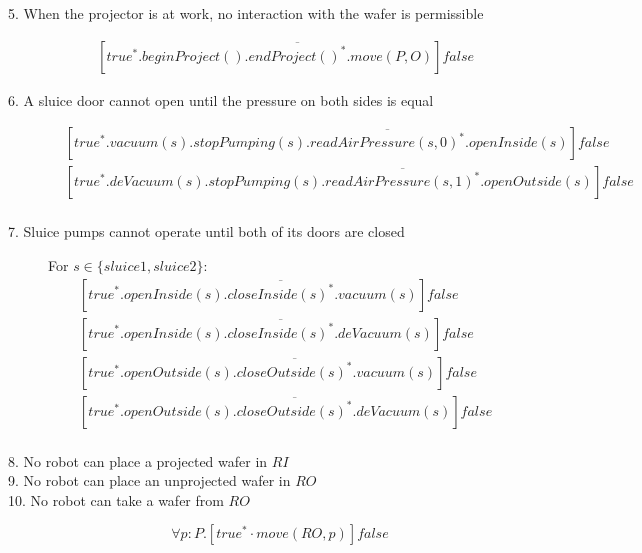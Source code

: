 \begin{description}
 
 \item[5. When the projector is at work, no interaction with the wafer is permissible]
 	\begin{align*}
 		&[true^*.beginProject().\overline{endProject()^*}.move(P,O)]false
	\end{align*}
	
 \item[6. A sluice door cannot open until the pressure on both sides is equal]
	\begin{align*}
		&[true^*.vacuum(s).stopPumping(s).\overline{readAirPressure(s,0)^*}.openInside(s)]false \\
		&[true^*.deVacuum(s).stopPumping(s).\overline{readAirPressure(s,1)^*}.openOutside(s)]false \\
	\end{align*}
	
 \item[7. Sluice pumps cannot operate until both of its doors are closed]
 
  For $s \in \{sluice1, sluice2\}:$
 \begin{align*}
		&[true^*.openInside(s).\overline{closeInside(s)^*}.vacuum(s)]false \\
		&[true^*.openInside(s).\overline{closeInside(s)^*}.deVacuum(s)]false \\
		&[true^*.openOutside(s).\overline{closeOutside(s)^*}.vacuum(s)]false \\
		&[true^*.openOutside(s).\overline{closeOutside(s)^*}.deVacuum(s)]false \\
	\end{align*}

 \item[8. No robot can place a projected wafer in $RI$]

 \item[9. No robot can place an unprojected wafer in $RO$]

 \item[10. No robot can take a wafer from $RO$]

\[
	\forall p:P . [true^* \cdot move(RO, p)]false
\]

\end{description}
